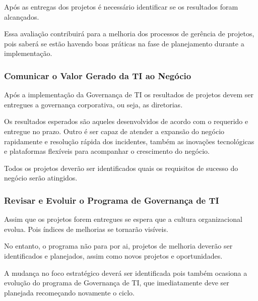 Após as entregas dos projetos é necessário identificar se os resultados foram alcançados.

Essa avaliação contribuirá para a melhoria dos processos de gerência de projetos, pois saberá se estão havendo boas práticas na fase de planejamento durante a implementação.
 
\subsubsection{Comunicar o Valor Gerado da TI ao Negócio}
 
 Após a implementação da Governança de TI os resultados de projetos devem ser entregues a governança corporativa, ou seja, as diretorias. 
 
 Os resultados esperados são aqueles desenvolvidos de acordo com o requerido e entregue no prazo. Outro é ser capaz de atender a expansão do negócio rapidamente e resolução rápida dos incidentes, também as inovações tecnológicas e plataformas flexíveis para acompanhar o crescimento do negócio.
 
 Todos os projetos deverão ser identificados quais os requisitos de sucesso do negócio serão atingidos.
 
 \subsubsection{Revisar e Evoluir o Programa de Governança de TI}
 
 Assim que os projetos forem entregues se espera que a cultura organizacional evolua. Pois índices de melhorias se tornarão visíveis.
 
 No entanto, o programa não para por ai, projetos de melhoria deverão ser identificados e planejados, assim como novos projetos e oportunidades. 
 
 A mudança no foco estratégico deverá ser identificada pois também ocasiona a evolução do programa de Governança de TI, que imediatamente deve ser planejada recomeçando novamente o ciclo.
 
